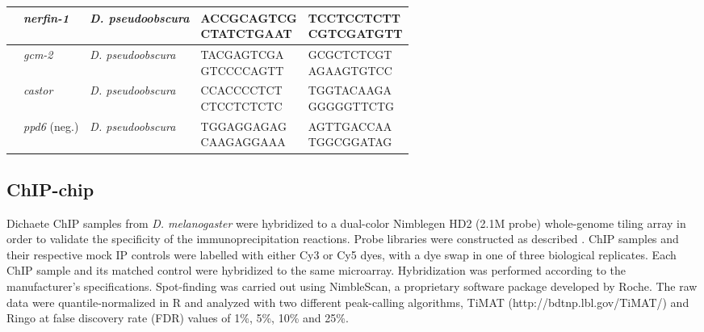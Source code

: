 \begin{center}
\begin{longtable}{|l|l|p{2.2cm}|p{3.3cm}|p{3.2cm}|}
         & \emph{nerfin-1}       & \emph{D. pseudoobscura} & \parbox[t]{3cm}{ACCGCAGTCG\\ CTATCTGAAT} & \parbox[t]{3cm}{TCCTCCTCTT\\ CGTCGATGTT} \\ \hline
         & \emph{gcm-2}         & \emph{D. pseudoobscura}  & \parbox[t]{3cm}{TACGAGTCGA\\ GTCCCCAGTT} & \parbox[t]{3cm}{GCGCTCTCGT\\ AGAAGTGTCC} \\ \hline
         & \emph{castor}         & \emph{D. pseudoobscura} & \parbox[t]{3cm}{CCACCCCTCT\\ CTCCTCTCTC} & \parbox[t]{3cm}{TGGTACAAGA\\ GGGGGTTCTG} \\ \hline
         & \emph{ppd6} (neg.)    & \emph{D. pseudoobscura} & \parbox[t]{3cm}{TGGAGGAGAG\\ CAAGAGGAAA} & \parbox[t]{3cm}{AGTTGACCAA\\ TGGCGGATAG} \\ \hline
\end{longtable}

\label{Table 2.1}
\end{center}

\subsection{ChIP-chip}
Dichaete ChIP samples from \emph{D. melanogaster} were hybridized to a dual-color Nimblegen HD2 (2.1M probe) whole-genome tiling array in order to validate the specificity of the immunoprecipitation reactions. Probe libraries were constructed as described \citep{sandmann_chip--chip_2007}. ChIP samples and their respective mock IP controls were labelled with either Cy3 or Cy5 dyes, with a dye swap in one of three biological replicates. Each ChIP sample and its matched control were hybridized to the same microarray. Hybridization was performed according to the manufacturer’s specifications. Spot-finding was carried out using NimbleScan, a proprietary software package developed by Roche. The raw data were quantile-normalized in R and analyzed with two different peak-calling algorithms, TiMAT (http://bdtnp.lbl.gov/TiMAT/) and Ringo \citep{toedling_ringo_2007} at false discovery rate (FDR) values of 1\%, 5\%, 10\% and 25\%.

